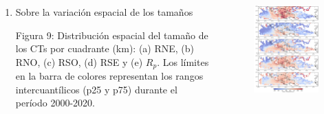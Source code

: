\begin{frame}
    \begin{columns}
        \begin{column}{0.4\textwidth}
            \begin{enumerate}
                \setcounter{enumi}{0}
                \item Sobre la variación espacial de los tamaños
            \begin{block}{Figura 9:}
                Distribución espacial del tamaño de los CTs por cuadrante (km): (a) RNE, (b) RNO, (c) RSO, (d) RSE y (e) $R_p$. Los límites en la barra de colores representan los rangos intercuantílicos (p25 y p75) durante el período 2000-2020.
            \end{block}
            \end{enumerate}
        \end{column}
        \begin{column}{0.6\textwidth}
        \begin{figure}
            \centering
            \includegraphics[scale = 0.17]{Images/Figures/Fig_3_6.jpeg}
            \caption{}
            \label{fig:fig_tamaño}
        \end{figure}
        \end{column}
    \end{columns}
\end{frame}

